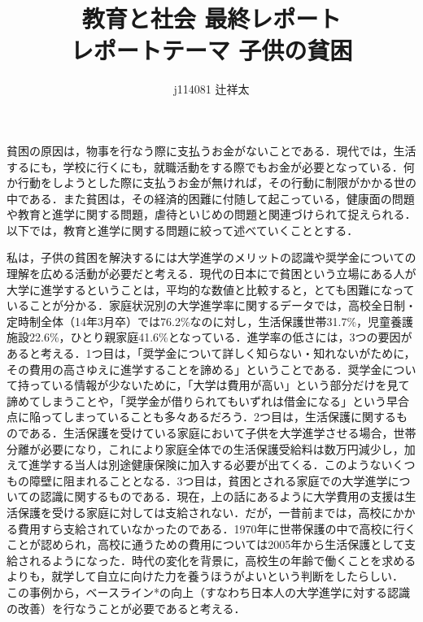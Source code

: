 \documentclass[10pt, a4paper]{jsarticle}
\title{教育と社会 最終レポート \\ レポートテーマ 子供の貧困}
\author{j114081 辻祥太}
\begin{document}
  \maketitle
  \newpage

  貧困の原因は，物事を行なう際に支払うお金がないことである．現代では，生活するにも，学校に行くにも，就職活動をする際でもお金が必要となっている．何か行動をしようとした際に支払うお金が無ければ，その行動に制限がかかる世の中である．また貧困は，その経済的困難に付随して起こっている，健康面の問題や教育と進学に関する問題，虐待といじめの問題と関連づけられて捉えられる．以下では，教育と進学に関する問題に絞って述べていくこととする．

  私は，子供の貧困を解決するには大学進学のメリットの認識や奨学金についての理解を広める活動が必要だと考える．現代の日本にで貧困という立場にある人が大学に進学するということは，平均的な数値と比較すると，とても困難になっていることが分かる．家庭状況別の大学進学率に関するデータでは，高校全日制・定時制全体（14年3月卒）では76.2\%なのに対し，生活保護世帯31.7\%，児童養護施設22.6\%，ひとり親家庭41.6\%となっている．進学率の低さには，3つの要因があると考える．1つ目は，「奨学金について詳しく知らない・知れないがために，その費用の高さゆえに進学することを諦める」ということである．奨学金について持っている情報が少ないために，「大学は費用が高い」という部分だけを見て諦めてしまうことや，「奨学金が借りられてもいずれは借金になる」という早合点に陥ってしまっていることも多々あるだろう．2つ目は，生活保護に関するものである．生活保護を受けている家庭において子供を大学進学させる場合，世帯分離が必要になり，これにより家庭全体での生活保護受給料は数万円減少し，加えて進学する当人は別途健康保険に加入する必要が出てくる．このようないくつもの障壁に阻まれることとなる．3つ目は，貧困とされる家庭での大学進学についての認識に関するものである．現在，上の話にあるように大学費用の支援は生活保護を受ける家庭に対しては支給されない．だが，一昔前までは，高校にかかる費用すら支給されていなかったのである．1970年に世帯保護の中で高校に行くことが認められ，高校に通うための費用については2005年から生活保護として支給されるようになった．時代の変化を背景に，高校生の年齢で働くことを求めるよりも，就学して自立に向けた力を養うほうがよいという判断をしたらしい． この事例から，ベースライン*の向上（すなわち日本人の大学進学に対する認識の改善）を行なうことが必要であると考える．%
\end{document}
